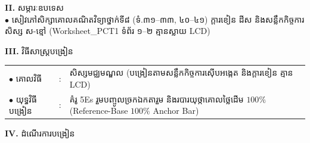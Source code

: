 \documentclass[a4paper,10pt]{article}
\newcommand{\en}[1]{{\TimesEn #1}}
\begin{document}
{%
\textbf{II.} {\muol សម្ភារៈឧបទេស}\\[1pt]
\hspace*{0.55cm}$\bullet$ \hspace{0.35cm} សៀវភៅសិក្សាគោលគណិតវិទ្យាថ្នាក់ទី៨ (ទំ.៣១–៣៣, ៤០–៤១) ក្ដារខៀន ដីស និងសន្លឹកកិច្ចការសិស្ស ស-ខ្មៅ (\en{Worksheet\_PCT1} ទំព័រ ១–២ គ្មានស្លាយ \en{LCD})

\vspace{2pt}

\textbf{III.} {\muol វិធីសាស្រ្តបង្រៀន}\\[1pt]
\hspace*{0.45cm}%
\begin{tabular}{@{}l l L{14.85cm}@{}}
  $\bullet$ \hspace{0.25cm} គោលវិធី & : & សិស្សមជ្ឈមណ្ឌល (បង្រៀនតាមសន្លឹកកិច្ចការស៊ើបអង្កេត និងក្ដារខៀន គ្មាន \en{LCD}) \\
  $\bullet$ \hspace{0.25cm} យុទ្ធវិធីបង្រៀន & : & គំរូ \en{5Es} រួមបញ្ចូលច្រកឯកតារួម និងរបារយុថ្កាគោលថ្លៃដើម $100\%$ (\en{Reference-Base $100\%$ Anchor Bar}) \\
\end{tabular}
}

\vspace{2pt}

\textbf{IV.} {\muol ដំណើរការបង្រៀន}

\vspace{1pt}
\end{document}
